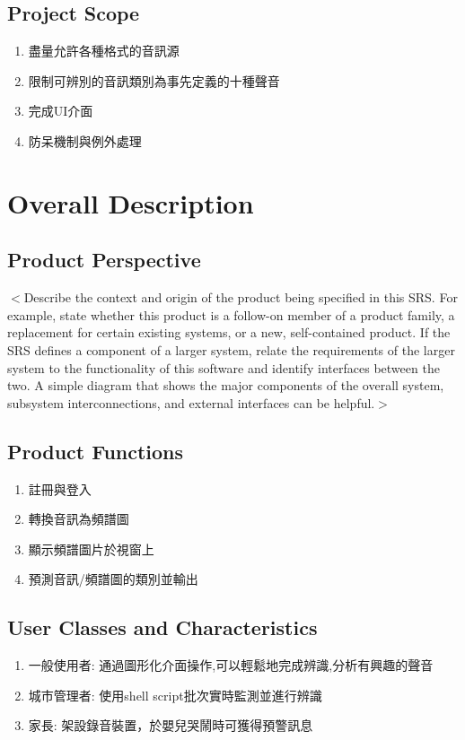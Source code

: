 \documentclass{scrreprt}
\begin{document}
\begin{CJK*}{UTF8}{bsmi}
\section{Project Scope}
\begin{enumerate}
\item 盡量允許各種格式的音訊源
\item 限制可辨別的音訊類別為事先定義的十種聲音
\item 完成UI介面
\item 防呆機制與例外處理
\end{enumerate}



\chapter{Overall Description}

\section{Product Perspective}
$<$Describe the context and origin of the product being specified in this SRS.  
For example, state whether this product is a follow-on member of a product 
family, a replacement for certain existing systems, or a new, self-contained 
product. If the SRS defines a component of a larger system, relate the 
requirements of the larger system to the functionality of this software and 
identify interfaces between the two. A simple diagram that shows the major 
components of the overall system, subsystem interconnections, and external 
interfaces can be helpful.$>$

\section{Product Functions}
\begin{enumerate}
\item 註冊與登入
\item 轉換音訊為頻譜圖
\item 顯示頻譜圖片於視窗上
\item 預測音訊/頻譜圖的類別並輸出
\end{enumerate}

\section{User Classes and Characteristics}
\begin{enumerate}
\item 一般使用者: 通過圖形化介面操作,可以輕鬆地完成辨識,分析有興趣的聲音
\item 城市管理者: 使用shell script批次實時監測並進行辨識
\item 家長: 架設錄音裝置，於嬰兒哭鬧時可獲得預警訊息
\end{enumerate}


\end{CJK*}
\end{document}
